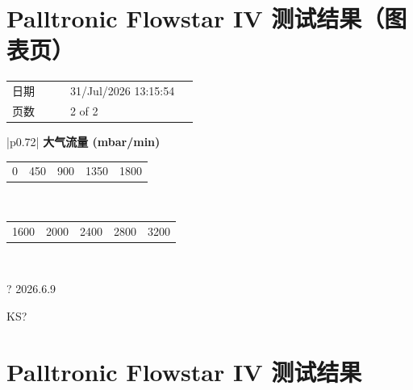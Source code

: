 \documentclass[UTF8,10pt,a4paper,fontset=fandol]{ctexart}
\newcommand{\fieldvalue}[1]{#1}
\newcommand{\handwritten}[1]{#1}
\begin{document}
\section{Palltronic Flowstar IV 测试结果（图表页）}

\begin{tabular}{@{}p{0.28\linewidth}p{0.62\linewidth}@{}}
日期 &
\fieldvalue{31/Jul/2026 13:15:54}
\\
页数 &
\fieldvalue{2 of 2}
\\
\end{tabular}

\begin{center}
\begin{tabular}{|p{0.72\linewidth}|}
\hline
\centering
\textbf{大气流量 (mbar/min)}
\\[0.2em]
\centering
\begin{tabular}{@{}ccccc@{}}
0 & 450 & 900 & 1350 & 1800
\end{tabular}
\\[1em]
\centering
\begin{tabular}{@{}ccccc@{}}
1600 & 2000 & 2400 & 2800 & 3200
\end{tabular}
\\
\hline
\end{tabular}
\end{center}

\handwritten{? 2026.6.9}

\handwritten{KS?}

\newpage

\section{Palltronic Flowstar IV 测试结果}
\end{document}
